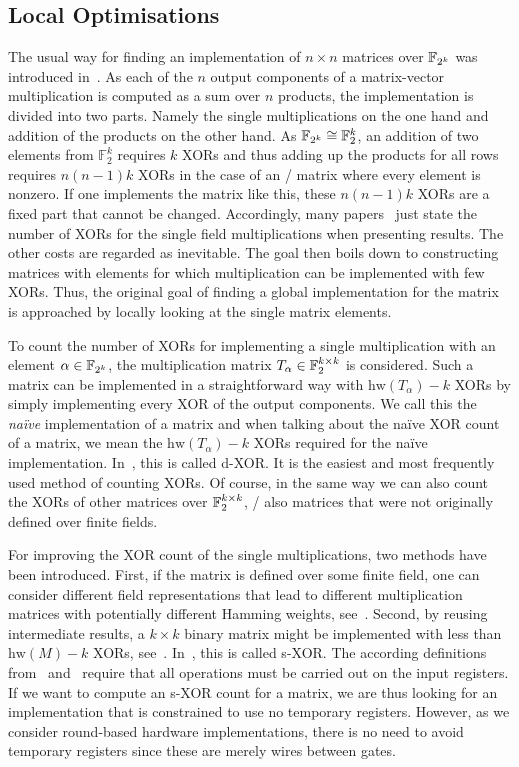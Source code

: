 \subsection{Local Optimisations}
\label{slps:subsec:xor1}
The usual way for finding an implementation of $n \times n$ matrices over $\mathbb{F}_{2^k}$ was introduced in~\cite{CHES:KPPY14}.
As each of the $n$ output components of a matrix-vector multiplication is computed as a sum over $n$ products, the implementation is divided into two parts.
Namely the single multiplications on the one hand and addition of the products on the other hand.
As $\mathbb{F}_{2^k} \cong \mathbb{F}_2^k$, an addition of two elements from $\mathbb{F}_2^k$ requires $k$ XORs and thus adding up the products for all rows requires $n(n-1)k$ XORs in the case of an \MDS/ matrix where every element is nonzero.
If one implements the matrix like this, these $n(n-1)k$ XORs are a fixed part that cannot be changed.
Accordingly, many papers~ just state the number of XORs for the single field multiplications when presenting results. The other costs are regarded as inevitable.
The goal then boils down to constructing matrices with elements for which multiplication can be implemented with few XORs.
Thus, the original goal of finding a global implementation for the matrix is approached by locally looking at the single matrix elements.

To count the number of XORs for implementing a single multiplication with an element $\alpha \in \mathbb{F}_{2^k}$, the multiplication matrix $T_\alpha \in \mathbb{F}_2^{k \times k}$ is considered.
Such a matrix can be implemented in a straightforward way with $\mathrm{hw}(T_\alpha)-k$ XORs by simply implementing every XOR of the output components.
We call this the \emph{na\"ive} implementation of a matrix and when talking about the na\"ive XOR count of a matrix, we mean the $\mathrm{hw}(T_\alpha)-k$ XORs required for the na\"ive implementation.
In~\cite{ToSC:JPST17}, this is called d-XOR\@.
It is the easiest and most frequently used method of counting XORs.
Of course, in the same way we can also count the XORs of other matrices over $\mathbb{F}_2^{k \times k}$, \ie/ also matrices that were not originally defined over finite fields.

For improving the XOR count of the single multiplications, two methods have been introduced.
First, if the matrix is defined over some finite field, one can consider different field representations that lead to different multiplication matrices with potentially different Hamming weights, see~.
Second, by reusing intermediate results, a $k \times k$ binary matrix might be implemented with less than $\mathrm{hw}(M)-k$ XORs, see~.
In~\cite{ToSC:JPST17}, this is called s-XOR\@.
The according definitions from~\cite{ToSC:JPST17} and~\cite{C:BeiKraLea16} require that all operations must be carried out on the input registers.
If we want to compute an s-XOR count for a matrix, we are thus looking for an implementation that is constrained to use no temporary registers.
However, as we consider round-based hardware implementations, there is no need to avoid temporary registers since these are merely wires between gates.

